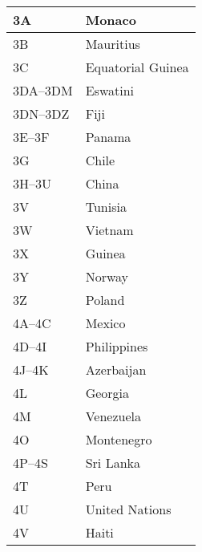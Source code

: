 \begin{longtable}{|l|l|}
  3A                  & Monaco                                    \\
  \hline
  3B                  & Mauritius                                 \\
  \hline
  3C                  & Equatorial Guinea                         \\
  \hline
  3DA--3DM            & Eswatini                                  \\
  \hline
  3DN--3DZ            & Fiji                                      \\
  \hline
  3E--3F              & Panama                                    \\
  \hline
  3G                  & Chile                                     \\
  \hline
  3H--3U              & China                                     \\
  \hline
  3V                  & Tunisia                                   \\
  \hline
  3W                  & Vietnam                                   \\
  \hline
  3X                  & Guinea                                    \\
  \hline
  3Y                  & Norway                                    \\
  \hline
  3Z                  & Poland                                    \\
  \hline
  4A--4C              & Mexico                                    \\
  \hline
  4D--4I              & Philippines                               \\
  \hline
  4J--4K              & Azerbaijan                                \\
  \hline
  4L                  & Georgia                                   \\
  \hline
  4M                  & Venezuela                                 \\
  \hline
  4O                  & Montenegro                                \\
  \hline
  4P--4S              & Sri Lanka                                 \\
  \hline
  4T                  & Peru                                      \\
  \hline
  4U                  & United Nations                            \\
  \hline
  4V                  & Haiti                                     \\

\end{longtable}
